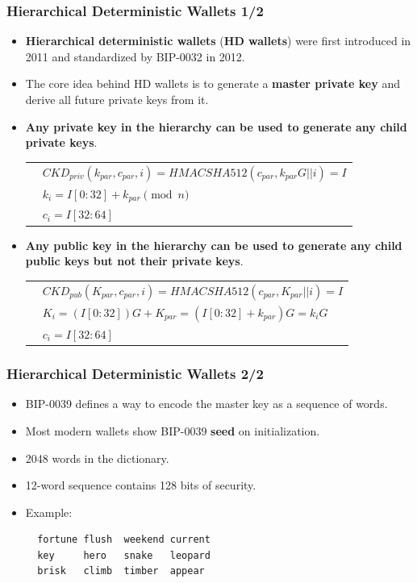 \documentclass{beamer}
\begin{document}
\begin{frame}[fragile]
  \frametitle{Hierarchical Deterministic Wallets 1/2}
  \begin{itemize}
  \item \textbf{Hierarchical deterministic wallets} (\textbf{HD wallets}) were
    first introduced in 2011 and standardized by BIP-0032 in 2012.
  \item The core idea behind HD wallets is to generate a \textbf{master private
      key} and derive all future private keys from it.
  \item \textbf{Any private key in the hierarchy can be used to generate any child
      private keys}.
    \begin{tabular}{rl}
      &${\scriptstyle \mathit{CKD_{priv}}(k_{par}, c_{par}, i) = \mathit{HMACSHA512}(c_{par},
        k_{par}G||i) = I}$ \\
      &${\scriptstyle k_i = I[0:32] + k_{par} \pmod{n}}$ \\
      &${\scriptstyle c_i = I[32:64]}$ \\
    \end{tabular}
  \item \textbf{Any public key in the hierarchy can be used to generate any
      child public keys but not their private keys}.
    \begin{tabular}{rl}
      &${\scriptstyle \mathit{CKD_{pub}}(K_{par}, c_{par}, i) = \mathit{HMACSHA512}(c_{par},
        K_{par}||i) = I}$ \\
      &${\scriptstyle K_i = (I[0:32])G + K_{par} = (I[0:32] + k_{par})G = k_iG}$ \\
      &${\scriptstyle c_i = I[32:64]}$ \\
    \end{tabular}
  \end{itemize}
\end{frame}

\begin{frame}[fragile]
  \frametitle{Hierarchical Deterministic Wallets 2/2}
  \begin{itemize}
  \item BIP-0039 defines a way to encode the master key as a sequence of words.
  \item Most modern wallets show BIP-0039 \textbf{seed} on initialization.
  \item 2048 words in the dictionary.
  \item 12-word sequence contains 128 bits of security.
  \item Example:
\begin{verbatim}
  fortune flush  weekend current
  key     hero   snake   leopard
  brisk   climb  timber  appear
\end{verbatim}
  \end{itemize}
\end{frame}
\end{document}
